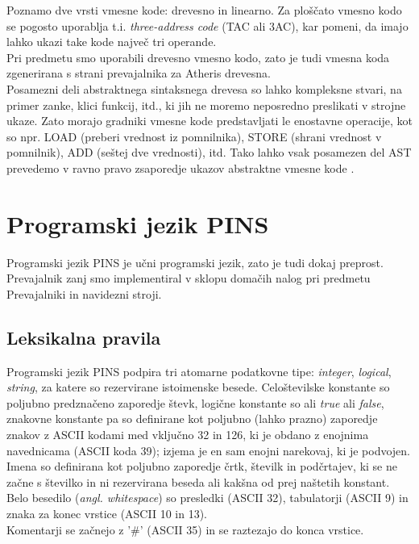 \documentclass[a4paper, 12p]{book}
\begin{document}
Poznamo dve vrsti vmesne kode: drevesno in linearno. Za ploščato vmesno kodo se pogosto uporablja t.i. \textit{three-address code} (TAC ali 3AC), kar pomeni, da imajo lahko ukazi take kode največ tri operande. \\
\indent Pri predmetu smo uporabili drevesno vmesno kodo, zato je tudi vmesna koda zgenerirana s strani prevajalnika za Atheris drevesna.\\
\indent Posamezni deli abstraktnega sintaksnega drevesa so lahko kompleksne stvari, na primer zanke, klici funkcij, itd., ki jih ne moremo neposredno preslikati v strojne ukaze. Zato morajo gradniki vmesne kode predstavljati le enostavne operacije, kot so npr. LOAD (preberi vrednost iz pomnilnika), STORE (shrani vrednost v pomnilnik), ADD (seštej dve vrednosti), itd. Tako lahko vsak posamezen del AST prevedemo v ravno pravo zsaporedje ukazov abstraktne vmesne kode \cite{modernCompiler}. \\ 

\chapter{Programski jezik PINS}

Programski jezik PINS je učni programski jezik, zato je tudi dokaj preprost. Prevajalnik zanj smo implementiral v sklopu domačih nalog pri predmetu Prevajalniki in navidezni stroji.

\section{Leksikalna pravila}

Programski jezik PINS podpira tri atomarne podatkovne tipe: \textit{integer}, \textit{logical}, \textit{string}, za katere so rezervirane istoimenske besede. Celoštevilske konstante so poljubno predznačeno zaporedje števk, logične konstante so ali \textit{true} ali \textit{false}, znakovne konstante pa so definirane kot poljubno (lahko prazno) zaporedje znakov z ASCII kodami med vključno 32 in 126, ki je obdano z enojnima navednicama (ASCII koda 39); izjema je en sam enojni narekovaj, ki je podvojen. \\
\indent Imena so definirana kot poljubno zaporedje črtk, številk in podčrtajev, ki se ne začne s številko in ni rezervirana beseda ali kakšna od prej naštetih konstant. \\
\indent Belo besedilo (\textit{angl. whitespace}) so presledki (ASCII 32), tabulatorji (ASCII 9) in znaka za konec vrstice (ASCII 10 in 13). \\
\indent Komentarji se začnejo z '\#' (ASCII 35) in se raztezajo do konca vrstice.
\end{document}
